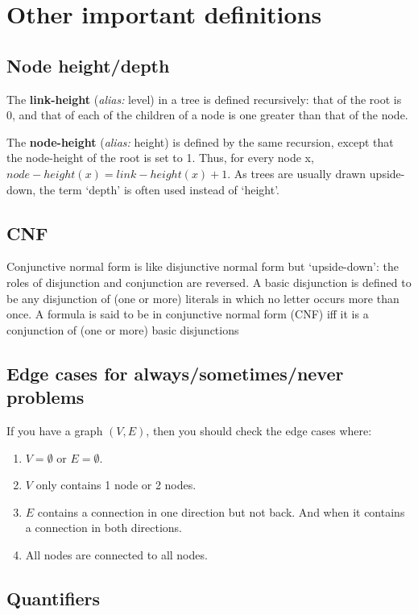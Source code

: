 \documentclass[twocolumn,a4paper]{article}
\begin{document}
\newpage
\section*{Other important definitions}
\subsection*{Node height/depth}
The \textbf{link-height} (\emph{alias:} level) in a tree is defined recursively: that of the root is 0, 
and that of each of the children of a node is one greater than that of the node.

The \textbf{node-height} (\emph{alias:} height) is defined by the same recursion,
except that the node-height of the root is set to 1.
Thus, for every node x, \(node-height(x) = link-height(x) + 1\).
As trees are usually drawn upside-down, the term `depth' is often used instead of `height'.

\subsection*{CNF}
Conjunctive normal form is like disjunctive normal form but `upside-down': the roles of disjunction and conjunction are reversed.
A basic disjunction is defined to be any disjunction of (one or more) literals in which no letter occurs more than once.
A formula is said to be in conjunctive normal form (CNF) iff it is a conjunction of (one or more) basic disjunctions

\subsection*{Edge cases for always/sometimes/never problems}
If you have a graph \((V, E)\), then you should check the edge cases where:
\begin{enumerate}
	\item \(V=\emptyset \) or \(E=\emptyset \).
	\item \(V\) only contains 1 node or 2 nodes.
	\item \(E\) contains a connection in one direction but not back. And when it contains a connection in both directions.
	\item All nodes are connected to all nodes.
\end{enumerate}

\subsection*{Quantifiers}
\end{document}
